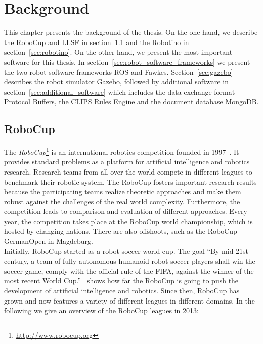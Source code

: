 \chapter{Background}
\label{cha:background}
This chapter presents the background of the thesis. On the one hand, we describe the RoboCup and LLSF in section~\ref{sec:robocup} and the Robotino in section~\ref{sec:robotino}. On the other hand, we present the most important software for this thesis. In section~\ref{sec:robot_software_frameworks} we present the two robot software frameworks ROS and Fawkes. Section~\ref{sec:gazebo} describes the robot simulator Gazebo, followed by additional software in section~\ref{sec:additional_software} which includes the data exchange format Protocol Buffers, the CLIPS Rules Engine and the document database MongoDB.

\section{RoboCup}
\label{sec:robocup}
The \textit{RoboCup}\footnote{\url{http://www.robocup.org}} is an international robotics competition founded in 1997~\cite{Robocup}. It provides standard problems as a platform for artificial intelligence and robotics research. Research teams from all over the world compete in different leagues to benchmark their robotic system. The RoboCup fosters important research results because the participating teams realize theoretic approaches and make them robust against the challenges of the real world complexity. Furthermore, the competition leads to comparison and evaluation of different approaches. Every year, the competition takes place at the RoboCup world championship, which is hosted by changing nations. There are also offshoots, such as the RoboCup GermanOpen in Magdeburg.\\
Initially, RoboCup started as a robot soccer world cup. The goal ``By mid-21st century, a team of fully autonomous humanoid robot soccer players shall win the soccer game, comply with the official rule of the FIFA, against the winner of the most recent World Cup.''~\cite{robocup_goal} shows how far the RoboCup is going to push the development of artificial intelligence and robotics. Since then, RoboCup has grown and now features a variety of different leagues in different domains. In the following we give an overview of the RoboCup leagues in 2013:\\

